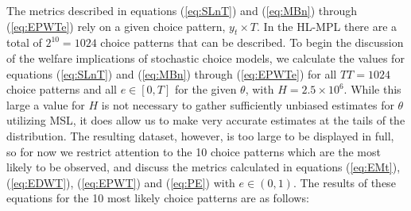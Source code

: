 \documentclass[../main.tex]{subfiles}
\begin{document}
The metrics described in equations (\ref{eq:SLnT}) and (\ref{eq:MBn}) through (\ref{eq:EPWTe}) rely on a given choice pattern, $y_t \times T$.
In the HL-MPL there are a total of $2^{10}=1024$ choice patterns that can be described.
To begin the discussion of the welfare implications of stochastic choice models, we calculate the values for equations (\ref{eq:SLnT}) and (\ref{eq:MBn}) through (\ref{eq:EPWTe}) for all $\mathit{TT} =1024$ choice patterns and all $e \in[0,T]$ for the given $\theta$, with $H=2.5 \times 10^6$.{\footnotemark} 
While this large a value for $H$ is not necessary to gather sufficiently unbiased estimates for $\theta$ utilizing MSL, it does allow us to make very accurate estimates at the tails of the distribution.{\footnotemark}
The resulting dataset, however, is too large to be displayed in full, so for now we restrict attention to the 10 choice patterns which are the most likely to be observed, and discuss the metrics calculated in equations (\ref{eq:EMt}), (\ref{eq:EDWT}), (\ref{eq:EPWT}) and (\ref{eq:PE}) with $e \in (0,1)$.
The results of these equations for the 10 most likely choice patterns are as follows:

\addtocounter{footnote}{-2}

\break
\end{document}
